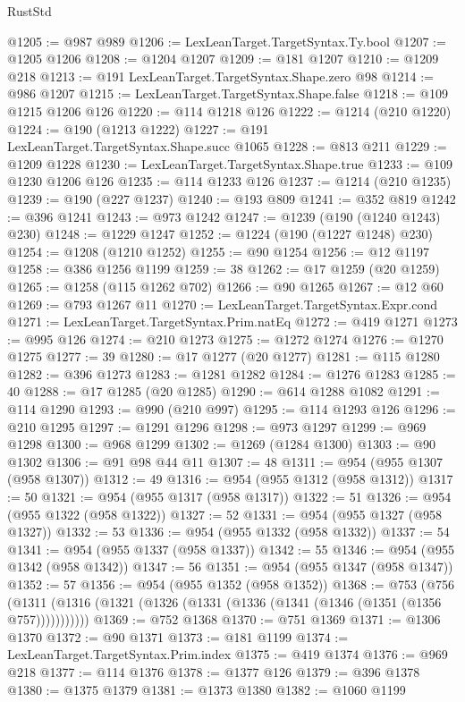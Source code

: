 \begin{lexlean}{RustStd}
\begin{coremodule}
{\begin{coremodule}
{{{{{{{{{{{{{{{{{{{{{{{{{{{{{{{{{{{{{{{{{{{{{{{{{{@1205 := @987 @989
@1206 := LexLeanTarget.TargetSyntax.Ty.bool
@1207 := @1205 @1206
@1208 := @1204 @1207
@1209 := @181 @1207
@1210 := @1209 @218
@1213 := @191 LexLeanTarget.TargetSyntax.Shape.zero @98
@1214 := @986 @1207
@1215 := LexLeanTarget.TargetSyntax.Shape.false
@1218 := @109 @1215 @1206 @126
@1220 := @114 @1218 @126
@1222 := @1214 (@210 @1220)
@1224 := @190 (@1213 @1222)
@1227 := @191 LexLeanTarget.TargetSyntax.Shape.succ @1065
@1228 := @813 @211
@1229 := @1209 @1228
@1230 := LexLeanTarget.TargetSyntax.Shape.true
@1233 := @109 @1230 @1206 @126
@1235 := @114 @1233 @126
@1237 := @1214 (@210 @1235)
@1239 := @190 (@227 @1237)
@1240 := @193 @809
@1241 := @352 @819
@1242 := @396 @1241
@1243 := @973 @1242
@1247 := @1239 (@190 (@1240 @1243) @230)
@1248 := @1229 @1247
@1252 := @1224 (@190 (@1227 @1248) @230)
@1254 := @1208 (@1210 @1252)
@1255 := @90 @1254
@1256 := @12 @1197
@1258 := @386 @1256 @1199
@1259 := 38
@1262 := @17 @1259 (@20 @1259)
@1265 := @1258 (@115 @1262 @702)
@1266 := @90 @1265
@1267 := @12 @60
@1269 := @793 @1267 @11
@1270 := LexLeanTarget.TargetSyntax.Expr.cond
@1271 := LexLeanTarget.TargetSyntax.Prim.natEq
@1272 := @419 @1271
@1273 := @995 @126
@1274 := @210 @1273
@1275 := @1272 @1274
@1276 := @1270 @1275
@1277 := 39
@1280 := @17 @1277 (@20 @1277)
@1281 := @115 @1280
@1282 := @396 @1273
@1283 := @1281 @1282
@1284 := @1276 @1283
@1285 := 40
@1288 := @17 @1285 (@20 @1285)
@1290 := @614 @1288 @1082
@1291 := @114 @1290
@1293 := @990 (@210 @997)
@1295 := @114 @1293 @126
@1296 := @210 @1295
@1297 := @1291 @1296
@1298 := @973 @1297
@1299 := @969 @1298
@1300 := @968 @1299
@1302 := @1269 (@1284 @1300)
@1303 := @90 @1302
@1306 := @91 @98 @44 @11
@1307 := 48
@1311 := @954 (@955 @1307 (@958 @1307))
@1312 := 49
@1316 := @954 (@955 @1312 (@958 @1312))
@1317 := 50
@1321 := @954 (@955 @1317 (@958 @1317))
@1322 := 51
@1326 := @954 (@955 @1322 (@958 @1322))
@1327 := 52
@1331 := @954 (@955 @1327 (@958 @1327))
@1332 := 53
@1336 := @954 (@955 @1332 (@958 @1332))
@1337 := 54
@1341 := @954 (@955 @1337 (@958 @1337))
@1342 := 55
@1346 := @954 (@955 @1342 (@958 @1342))
@1347 := 56
@1351 := @954 (@955 @1347 (@958 @1347))
@1352 := 57
@1356 := @954 (@955 @1352 (@958 @1352))
@1368 := @753
    (@756 (@1311 (@1316 (@1321 (@1326 (@1331 (@1336 (@1341 (@1346 (@1351 (@1356 @757)))))))))))
@1369 := @752 @1368
@1370 := @751 @1369
@1371 := @1306 @1370
@1372 := @90 @1371
@1373 := @181 @1199
@1374 := LexLeanTarget.TargetSyntax.Prim.index
@1375 := @419 @1374
@1376 := @969 @218
@1377 := @114 @1376
@1378 := @1377 @126
@1379 := @396 @1378
@1380 := @1375 @1379
@1381 := @1373 @1380
@1382 := @1060 @1199
}}}}}}}}}}}}}}}}}}}}}}}}}}}}}}}}}}}}}}}}}}}}}}}}}}
\end{coremodule}}
\end{coremodule}
\end{lexlean}
